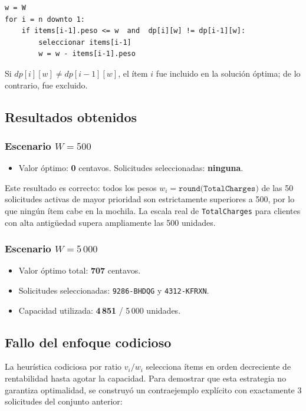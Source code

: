\documentclass[12pt, a4paper]{article}
\begin{document}
\begin{lstlisting}
w = W
for i = n downto 1:
    if items[i-1].peso <= w  and  dp[i][w] != dp[i-1][w]:
        seleccionar items[i-1]
        w = w - items[i-1].peso
\end{lstlisting}

Si $dp[i][w] \neq dp[i-1][w]$, el ítem $i$ fue incluido en la solución óptima; de lo contrario, fue excluido.

\subsection{Resultados obtenidos}

\subsubsection*{Escenario $W = 500$}

\begin{itemize}
  \item Valor óptimo: \textbf{0} centavos. Solicitudes seleccionadas: \textbf{ninguna}.
\end{itemize}

Este resultado es correcto: todos los pesos $w_i = \texttt{round(TotalCharges)}$ de las 50 solicitudes activas de mayor prioridad son estrictamente superiores a 500, por lo que ningún ítem cabe en la mochila. La escala real de \texttt{TotalCharges} para clientes con alta antigüedad supera ampliamente las 500 unidades.

\subsubsection*{Escenario $W = 5\,000$}

\begin{itemize}
  \item Valor óptimo total: \textbf{707} centavos.
  \item Solicitudes seleccionadas: \texttt{9286-BHDQG} y \texttt{4312-KFRXN}.
  \item Capacidad utilizada: \textbf{4\,851} / 5\,000 unidades.
\end{itemize}

\subsection{Fallo del enfoque codicioso}

La heurística codiciosa por ratio $v_i/w_i$ selecciona ítems en orden decreciente de rentabilidad hasta agotar la capacidad. Para demostrar que esta estrategia no garantiza optimalidad, se construyó un contraejemplo explícito con exactamente 3 solicitudes del conjunto anterior:
\end{document}
